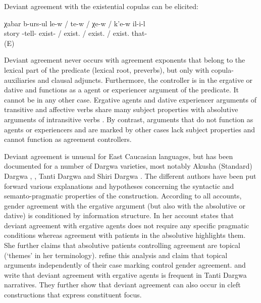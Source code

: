 Deviant agreement with the existential copulas can be elicited:

\begin{exe}
	\ex	\label{ex:telling a storyLOCCOP}
	\gll	χabar	b-urs-ul	le-w	/	te-w	/	χe-w	/	k'e-w	il-i-l\\
		story	-tell-	exist- / 	exist. / 	exist.	/	exist.	that-\\
	\glt	{} (E)
\end{exe}


Deviant agreement never occurs with agreement exponents that belong to the lexical part of the predicate (lexical root, preverbs), but only with copula-auxiliaries and clausal adjuncts. Furthermore, the controller is in the ergative or dative and functions as a agent or experiencer argument of the predicate. It cannot be in any other case. Ergative agents and dative experiencer arguments of transitive and affective verbs share many subject properties with absolutive arguments of intransitive verbs \citet{Forker2017, Forker2019}. By contrast, arguments that do not function as agents or experiencers and are marked by other cases lack subject properties and cannot function as agreement controllers.

Deviant agreement is unusual for East Caucasian languages, but has been documented for a number of Dargwa varieties, most notably Akusha (Standard) Dargwa \citet{vandenBerg1999}, \citet{GanenkovForthcoming}, Tanti Dargwa \citet[450]{Sumbatova.Lander2014} and Shiri Dargwa \citet{Belyaev2016, Belyaev2017a, Belyaev2017b}. The different authors have been put forward various explanations and hypotheses concerning the syntactic and semanto-pragmatic properties of the construction. According to all accounts, gender agreement with the ergative argument (but also with the absolutive or dative) is conditioned by information structure. In her account \citet{vandenBerg1999} states that deviant agreement with ergative agents does not require any specific pragmatic conditions whereas agreement with patients in the absolutive highlights them. She further claims that absolutive patients controlling agreement are topical (‘themes' in her terminology). \citet{Sumbatova.Lander2014} refine this analysis and claim that topical arguments independently of their case marking control gender agreement. \citet{Sumbatova2010} and \citet{Sumbatova.Lander2014} write that deviant agreement with ergative agents is frequent in Tanti Dargwa narratives. They further show that deviant agreement can also occur in cleft constructions that express constituent focus.




